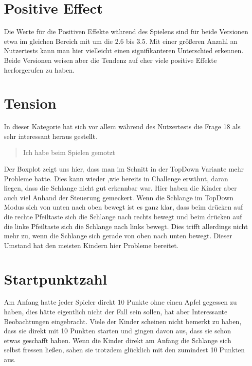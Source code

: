 \section{Positive Effect}
\label{sec:poseffDisk}
Die Werte für die Positiven Effekte während des Spielens sind für beide Versionen etwa im gleichen Bereich mit um die 2.6 bis 3.5. Mit einer größeren Anzahl an Nutzertests kann man hier vielleicht einen signifikanteren Unterschied erkennen. Beide Versionen weisen aber die Tendenz auf eher viele positive Effekte herforgerufen zu haben.
\section{Tension}
\label{sec:tensionDisk}
In dieser Kategorie hat sich vor allem während des Nutzertests die Frage 18 als sehr interessant heraus gestellt.
\begin{quote}
Ich habe beim Spielen gemotzt
\end{quote}
Der Boxplot zeigt uns hier, dass man im Schnitt in der TopDown Variante mehr Probleme hatte. Dies kann wieder ,wie bereits in Challenge erwähnt, daran liegen, dass die Schlange nicht gut erkennbar war. Hier haben die Kinder aber auch viel Anhand der Steuerung gemeckert. Wenn die Schlange im TopDown Modus sich von unten nach oben bewegt ist es ganz klar, dass beim drücken auf die rechte Pfeiltaste sich die Schlange nach rechts bewegt und beim drücken auf die linke Pfeiltaste sich die Schlange nach links bewegt. Dies trifft allerdings nicht mehr zu, wenn die Schlange sich gerade von oben nach unten bewegt. Dieser Umstand hat den meisten Kindern hier Probleme bereitet.

\section{Startpunktzahl}
\label{sec:startpointsDisk}
Am Anfang hatte jeder Spieler direkt 10 Punkte ohne einen Apfel gegessen zu haben, dies hätte eigentlich nicht der Fall sein sollen, hat aber Interessante Beobachtungen eingebracht. Viele der Kinder scheinen nicht bemerkt zu haben, dass sie direkt mit 10 Punkten starten und gingen davon aus, dass sie schon etwas geschafft haben. Wenn die Kinder direkt am Anfang die Schlange sich selbst fressen ließen, sahen sie trotzdem glücklich mit den zumindest 10 Punkten aus.
